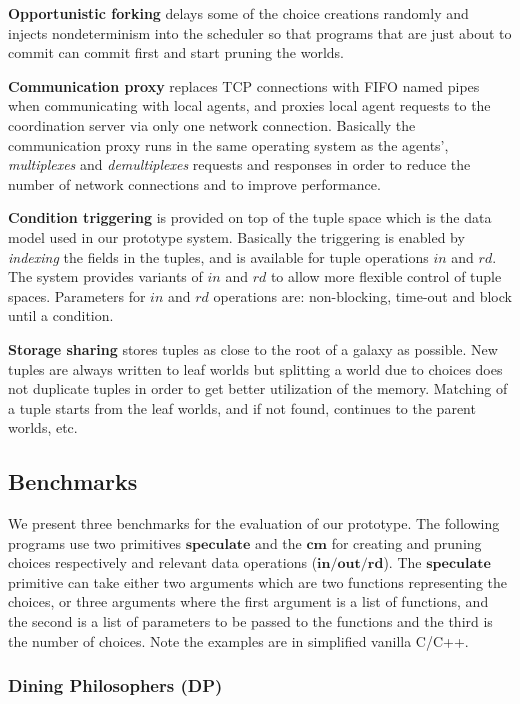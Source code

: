 {\bf Opportunistic forking} delays some of the choice creations randomly 
and injects nondeterminism into the scheduler so that programs that are just
about to commit can commit first and start pruning the worlds.

{\bf Communication proxy} replaces TCP connections with FIFO named 
pipes when communicating with local agents, and proxies local agent 
requests to the coordination server via only one network connection. 
Basically the communication proxy runs in the same operating system 
as the agents', \emph{multiplexes} and \emph{demultiplexes} requests and 
responses in order to reduce the number of network connections 
and to improve performance.

{\bf Condition triggering} is provided on top of the tuple space 
which is the data model used in our prototype system. 
Basically the triggering is enabled by \emph{indexing} 
the fields in the tuples, and is available for tuple operations
$in$ and $rd$. The system provides variants of $in$ and $rd$ 
to allow more flexible control of tuple spaces. 
Parameters for $in$ and $rd$ operations are: 
non-blocking, time-out and block until a condition.

{\bf Storage sharing} stores tuples as close to the root of a galaxy 
as possible. New tuples are always written to leaf worlds but 
splitting a world due to choices does not duplicate tuples 
in order to get better utilization of the memory. 
Matching of a tuple starts from the leaf worlds, and if not found, 
continues to the parent worlds, etc.

\subsection{Benchmarks}
\label{sec:benchmarks}

We present three benchmarks for the evaluation of our prototype.
The following programs use two primitives $\mathbf{speculate}$ and 
the $\mathbf{cm}$ for creating and pruning choices respectively and
relevant data operations ($\mathbf{in}/\mathbf{out}/\mathbf{rd}$).
The $\mathbf{speculate}$ primitive can take either two arguments
which are two functions representing the choices, or three
arguments where the first argument is a list of functions,
and the second is a list of parameters to be passed to the functions
and the third is the number of choices.
Note the examples are in simplified vanilla C/C++.

\subsubsection*{Dining Philosophers (DP)}

